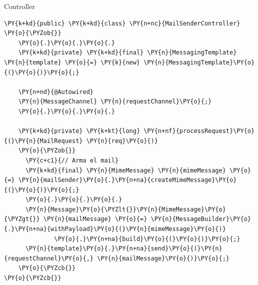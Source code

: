 \documentclass{beamer}
\begin{document}
\begin{frame}[fragile]{Controller}
\begin{Verbatim}[fontsize=\tiny,commandchars=\\\{\}]
\PY{k+kd}{public} \PY{k+kd}{class} \PY{n+nc}{MailSenderController}
\PY{o}{\PYZob{}}
    \PY{o}{.}\PY{o}{.}\PY{o}{.}
    \PY{k+kd}{private} \PY{k+kd}{final} \PY{n}{MessagingTemplate} \PY{n}{template} \PY{o}{=} \PY{k}{new} \PY{n}{MessagingTemplate}\PY{o}{(}\PY{o}{)}\PY{o}{;}

    \PY{n+nd}{@Autowired}
    \PY{n}{MessageChannel} \PY{n}{requestChannel}\PY{o}{;}
    \PY{o}{.}\PY{o}{.}\PY{o}{.}
    
    \PY{k+kd}{private} \PY{k+kt}{long} \PY{n+nf}{processRequest}\PY{o}{(}\PY{n}{MailRequest} \PY{n}{req}\PY{o}{)}
    \PY{o}{\PYZob{}}
      \PY{c+c1}{// Arma el mail}
      \PY{k+kd}{final} \PY{n}{MimeMessage} \PY{n}{mimeMessage} \PY{o}{=} \PY{n}{mailSender}\PY{o}{.}\PY{n+na}{createMimeMessage}\PY{o}{(}\PY{o}{)}\PY{o}{;}
      \PY{o}{.}\PY{o}{.}\PY{o}{.}
      \PY{n}{Message}\PY{o}{\PYZlt{}}\PY{n}{MimeMessage}\PY{o}{\PYZgt{}} \PY{n}{mailMessage} \PY{o}{=} \PY{n}{MessageBuilder}\PY{o}{.}\PY{n+na}{withPayload}\PY{o}{(}\PY{n}{mimeMessage}\PY{o}{)}
              \PY{o}{.}\PY{n+na}{build}\PY{o}{(}\PY{o}{)}\PY{o}{;}
      \PY{n}{template}\PY{o}{.}\PY{n+na}{send}\PY{o}{(}\PY{n}{requestChannel}\PY{o}{,} \PY{n}{mailMessage}\PY{o}{)}\PY{o}{;}      
    \PY{o}{\PYZcb{}}
\PY{o}{\PYZcb{}}
\end{Verbatim}
\end{frame}
\end{document}
